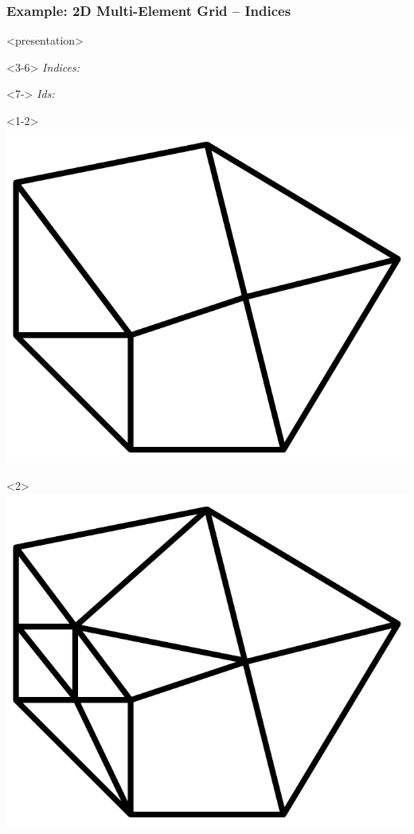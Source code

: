 \documentclass[ignorenonframetext,11pt]{beamer}
\theoremstyle{definition}
\begin{document}
\begin{frame}
  \frametitle{Example: 2D Multi-Element Grid -- Indices}

  \begin{onlyenv}<presentation>
    \vspace*{2ex}
    \begin{overlayarea}{\linewidth}{3ex}
      \medskip
      \begin{onlyenv}<3-6> \emph{Indices:}
      \end{onlyenv}
      \begin{onlyenv}<7-> \emph{Ids:}
      \end{onlyenv}
    \end{overlayarea}
  \end{onlyenv}

  \begin{overlayarea}{\linewidth}{0.45\linewidth}
    \begin{center}

    \begin{onlyenv}<1-2>
      \includegraphics[width=0.4\linewidth]{index-grid0}
      \hfill
      \begin{onlyenv}<2>
        \includegraphics[width=0.4\linewidth]{index-grid1}\par
      \end{onlyenv}
    \end{onlyenv}


\end{center}
\end{overlayarea}
\end{frame}
\end{document}
